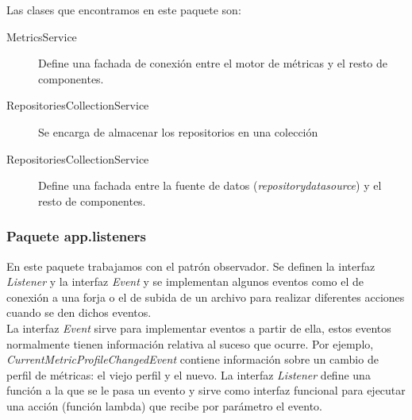 Las clases que encontramos en este paquete son:

\begin{description}
	\item[MetricsService] Define una fachada de conexión entre el motor de métricas y el resto de componentes.
	\item[RepositoriesCollectionService] Se encarga de almacenar los repositorios en una colección
	\item[RepositoriesCollectionService] Define una fachada entre la fuente de datos (\textit{repositorydatasource}) y el resto de componentes.
\end{description}

\subsubsection{Paquete app.listeners}
En este paquete trabajamos con el patrón observador. Se definen la interfaz \textit{Listener} y la interfaz \textit{Event} y se implementan algunos eventos como el de conexión a una forja o el de subida de un archivo para realizar diferentes acciones cuando se den dichos eventos.\\ 
La interfaz \textit{Event} sirve para implementar eventos a partir de ella, estos eventos normalmente tienen información relativa al suceso que ocurre. Por ejemplo, \textit{CurrentMetricProfileChangedEvent} contiene información sobre un cambio de perfil de métricas: el viejo perfil y el nuevo. La interfaz \textit{Listener} define una función a la que se le pasa un evento y sirve como interfaz funcional para ejecutar una acción (función lambda) que recibe por parámetro el evento.
